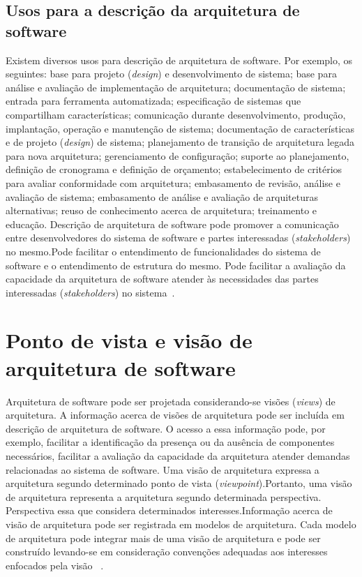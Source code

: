 \subsection{Usos para a descrição da arquitetura de software}

Existem diversos usos para descrição de arquitetura de software. Por exemplo, os seguintes: base para projeto (\emph{design}) e desenvolvimento de sistema; base para análise e avaliação de implementação de arquitetura; documentação de sistema; entrada para ferramenta automatizada; especificação de sistemas que compartilham características; comunicação durante desenvolvimento, produção, implantação, operação e manutenção de sistema; documentação de características e de projeto (\emph{design}) de sistema; planejamento de transição de arquitetura legada para nova arquitetura; gerenciamento de configuração; suporte ao planejamento, definição de cronograma e definição de orçamento; estabelecimento de critérios para avaliar conformidade com arquitetura; embasamento de revisão, análise e avaliação de sistema; embasamento de análise e avaliação de arquiteturas alternativas; reuso de conhecimento acerca de arquitetura; treinamento e educação.
Descrição de arquitetura de software pode promover a comunicação entre desenvolvedores do sistema de software e partes interessadas (\emph{stakeholders}) no mesmo.Pode facilitar o entendimento de funcionalidades do sistema de software e o entendimento de estrutura do mesmo. Pode facilitar a avaliação da capacidade da arquitetura de software atender às necessidades das partes interessadas (\emph{stakeholders}) no sistema~\cite{ISO_42010}. 

\section{Ponto de vista e visão de arquitetura de software}


Arquitetura de software pode ser projetada considerando-se visões (\emph{views}) de arquitetura. 
A informação acerca de visões de arquitetura pode ser incluída em descrição de arquitetura de software.
O acesso a essa informação pode, por exemplo, facilitar a identificação da presença ou da ausência de componentes necessários, facilitar a avaliação da capacidade da arquitetura atender demandas relacionadas ao sistema de software.
Uma visão de arquitetura expressa a arquitetura segundo determinado ponto de vista (\emph{viewpoint}).Portanto, uma visão de arquitetura representa a arquitetura segundo determinada perspectiva. Perspectiva essa que considera determinados interesses.Informação acerca de visão de arquitetura pode ser registrada em modelos de arquitetura. Cada modelo de arquitetura pode integrar mais de uma visão de arquitetura e pode ser construído levando-se em consideração convenções adequadas aos interesses enfocados pela visão  ~\cite{ISO_42010}.

